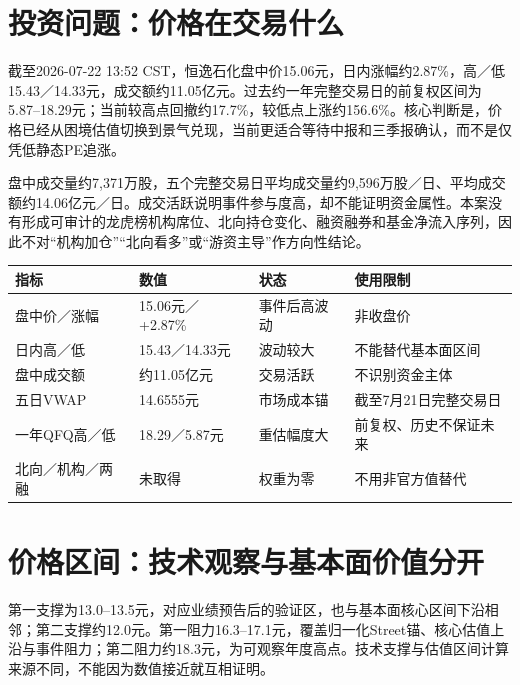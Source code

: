 \section{投资问题：价格在交易什么}

截至2026-07-22 13:52 CST，恒逸石化盘中价15.06元，日内涨幅约2.87\%，高／低15.43／14.33元，成交额约11.05亿元。过去约一年完整交易日的前复权区间为5.87--18.29元；当前较高点回撤约17.7\%，较低点上涨约156.6\%。核心判断是，价格已经从困境估值切换到景气兑现，当前更适合等待中报和三季报确认，而不是仅凭低静态PE追涨。

盘中成交量约7,371万股，五个完整交易日平均成交量约9,596万股／日、平均成交额约14.06亿元／日。成交活跃说明事件参与度高，却不能证明资金属性。本案没有形成可审计的龙虎榜机构席位、北向持仓变化、融资融券和基金净流入序列，因此不对“机构加仓”“北向看多”或“游资主导”作方向性结论。

\begin{exhibitbox}[二级市场状态]
\noindent\begin{tabularx}{\textwidth}{L{3.55cm}R{2.2cm}L{2.5cm}X}
\toprule
\textbf{指标} & \textbf{数值} & \textbf{状态} & \textbf{使用限制} \\
\midrule
盘中价／涨幅 & 15.06元／+2.87\% & 事件后高波动 & 非收盘价 \\
日内高／低 & 15.43／14.33元 & 波动较大 & 不能替代基本面区间 \\
盘中成交额 & 约11.05亿元 & 交易活跃 & 不识别资金主体 \\
五日VWAP & 14.6555元 & 市场成本锚 & 截至7月21日完整交易日 \\
一年QFQ高／低 & 18.29／5.87元 & 重估幅度大 & 前复权、历史不保证未来 \\
北向／机构／两融 & 未取得 & 权重为零 & 不用非官方值替代 \\
\bottomrule
\end{tabularx}
\end{exhibitbox}

\section{价格区间：技术观察与基本面价值分开}

第一支撑为13.0--13.5元，对应业绩预告后的验证区，也与基本面核心区间下沿相邻；第二支撑约12.0元。第一阻力16.3--17.1元，覆盖归一化Street锚、核心估值上沿与事件阻力；第二阻力约18.3元，为可观察年度高点。技术支撑与估值区间计算来源不同，不能因为数值接近就互相证明。

